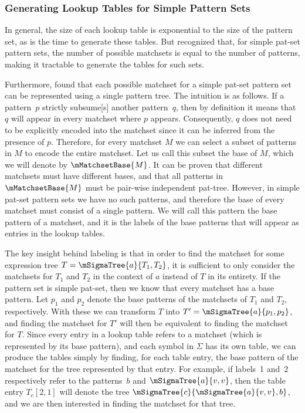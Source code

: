 {\subsubsection{Generating Lookup Tables for Simple Pattern Sets}

In general, the size of each lookup table is exponential to the size of the
\gls{pattern set}, as is the time to generate these tables.
%
But
\citeauthor{Hoffmann1982} recognized that, for \gls{simple pat-set}
\glspl{pattern set}, the number of possible \glspl{matchset} is equal to the
number of \glspl{pattern}, making it tractable to generate the tables for such
sets.

Furthermore, \citeauthor{Hoffmann1982} found that each possible \gls{matchset}
for a \gls{simple pat-set} \gls{pattern set} can be represented using a single
\gls{pattern tree}.
%
The intuition is as follows.
%
If a \gls{pattern}~$p$
\gls{strictly subsume}[s] another \gls{pattern}~$q$, then by definition it means
that $q$ will appear in every \gls{matchset} where $p$ appears.
%
Consequently,
$q$ does not need to be explicitly encoded into the \gls{matchset} since it can
be inferred from the presence of $p$.
%
Therefore, for every \gls{matchset} $M$ we
can select a subset of \glspl{pattern} in $M$ to encode the entire
\gls{matchset}.
%
Let us call this subset the \gls{base} of $M$, which we will
denote by $\mMatchsetBase{M}$.
%
It can be proven that different \glspl{matchset}
must have different \glspl{base}, and that all \glspl{pattern} in
$\mMatchsetBase{M}$ must be pair-wise \gls{independent pat-tree}.
%
However, in
\gls{simple pat-set} \glspl{pattern set} we have no such \glspl{pattern}, and
therefore the \gls{base} of every \gls{matchset} must consist of a single
\gls{pattern}.
%
We will call this \gls{pattern} the \gls{base pattern} of a
\gls{matchset}, and it is the labels of the \glspl{base pattern} that will
appear as entries in the lookup tables.

The key insight behind labeling is that in order to find the \gls{matchset} for
some \gls{expression tree} \mbox{$T = \mSigmaTree{a}{T_1, T_2}$}, it is sufficient
to only consider the \glspl{matchset} for $T_1$ and $T_2$ in the context of $a$
instead of $T$ in its entirety.
%
If the \gls{pattern set} is \gls{simple
  pat-set}, then we know that every \gls{matchset} has a \gls{base pattern}.
%
Let
$p_1$ and $p_2$ denote the \glspl{base pattern} of the \glspl{matchset} of $T_1$
and $T_2$, respectively.
%
With these we can transform $T$ into \mbox{$T' =
  \mSigmaTree{a}{p_1, p_2}$}, and finding the \gls{matchset} for $T'$ will then
be equivalent to finding the \gls{matchset} for $T$.
%
Since every entry in a
lookup table refers to a \gls{matchset} (which is represented by its \gls{base
  pattern}), and each \gls{symbol} in $\Sigma$ has its own table, we can produce
the tables simply by finding, for each table entry, the \gls{base pattern} of
the \gls{matchset} for the \gls{tree} represented by that entry.
%
For example, if
labels~1 and~2 respectively refer to the \glspl{pattern}~$b$ and
\mbox{$\mSigmaTree{a}{v, v}$}, then the table entry \mbox{$T_c[2, 1]$} will
denote the \gls{tree} \mbox{$\mSigmaTree{c}{\mSigmaTree{a}{v, v}, b}$}, and we
are then interested in finding the \gls{matchset} for that \gls{tree}.

}
